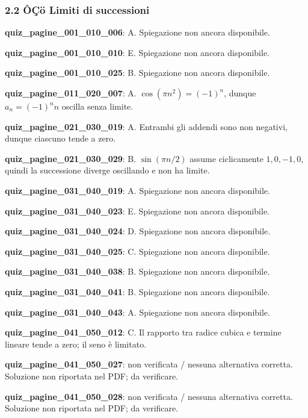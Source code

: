 \documentclass[11pt,a4paper]{article}
\newcounter{quiz}
\begin{document}
\subsubsection*{2.2 ÔÇö Limiti di successioni}
\noindent\textbf{quiz\_pagine\_001\_010\_006}: A. Spiegazione non ancora disponibile.\par\medskip
\noindent\textbf{quiz\_pagine\_001\_010\_010}: E. Spiegazione non ancora disponibile.\par\medskip
\noindent\textbf{quiz\_pagine\_001\_010\_025}: B. Spiegazione non ancora disponibile.\par\medskip
\noindent\textbf{quiz\_pagine\_011\_020\_007}: A. $\cos(\pi n^2)=(-1)^n$, dunque $a_n=(-1)^n n$ oscilla senza limite.\par\medskip
\noindent\textbf{quiz\_pagine\_021\_030\_019}: A. Entrambi gli addendi sono non negativi, dunque ciascuno tende a zero.\par\medskip
\noindent\textbf{quiz\_pagine\_021\_030\_029}: B. $\sin(\pi n/2)$ assume ciclicamente $1,0,-1,0$, quindi la successione diverge oscillando e non ha limite.\par\medskip
\noindent\textbf{quiz\_pagine\_031\_040\_019}: A. Spiegazione non ancora disponibile.\par\medskip
\noindent\textbf{quiz\_pagine\_031\_040\_023}: E. Spiegazione non ancora disponibile.\par\medskip
\noindent\textbf{quiz\_pagine\_031\_040\_024}: D. Spiegazione non ancora disponibile.\par\medskip
\noindent\textbf{quiz\_pagine\_031\_040\_025}: C. Spiegazione non ancora disponibile.\par\medskip
\noindent\textbf{quiz\_pagine\_031\_040\_038}: B. Spiegazione non ancora disponibile.\par\medskip
\noindent\textbf{quiz\_pagine\_031\_040\_041}: B. Spiegazione non ancora disponibile.\par\medskip
\noindent\textbf{quiz\_pagine\_031\_040\_043}: A. Spiegazione non ancora disponibile.\par\medskip
\noindent\textbf{quiz\_pagine\_041\_050\_012}: C. Il rapporto tra radice cubica e termine lineare tende a zero; il seno è limitato.\par\medskip
\noindent\textbf{quiz\_pagine\_041\_050\_027}: non verificata / nessuna alternativa corretta. Soluzione non riportata nel PDF; da verificare.\par\medskip
\noindent\textbf{quiz\_pagine\_041\_050\_028}: non verificata / nessuna alternativa corretta. Soluzione non riportata nel PDF; da verificare.\par\medskip
\end{document}
